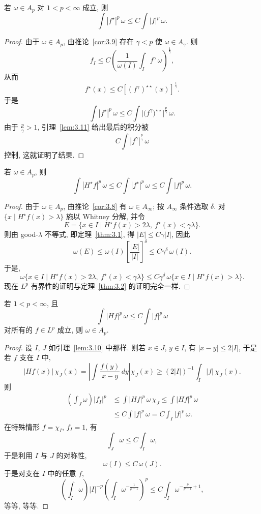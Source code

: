 \begin{theorem}\label{thm:3.12}
若 $\omega\in A_p$ 对 $1<p<\infty$ 成立, 则
\[
\int|f^{\star}|^{p}\,\omega\leq C\int|f|^{p}\,\omega.
\]
\end{theorem}

\begin{proof}
由于 $\omega\in A_p$, 由推论~\ref{cor:3.9} 存在 $\gamma<p$ 使 $\omega\in A_\gamma$. 则
\[
f_{I}\leq C\left(\frac{1}{\omega(I)}\int_{I}f^{\gamma}\,\omega\right)^{\frac{1}{\gamma}},
\]
从而
\[
f^{\star}(x)\leq C\left[\left(f^{\gamma}\right)^{\star\star}(x)\right]^{\frac{1}{\gamma}}.
\]
于是
\[
\int|f^{\star}|^{p}\,\omega\leq C\int\bigl|\bigl(f^{\gamma}\bigr)^{\star\star}\bigr|^{\frac{p}{\gamma}}\,\omega.
\]
由于 $\frac{p}{\gamma}>1$, 引理~\ref{lem:3.11} 给出最后的积分被
\[
C\int|f^{\gamma}|^{\frac{p}{\gamma}}\,\omega
\]
控制, 这就证明了结果.
\end{proof}

\begin{theorem}\label{thm:3.13}
若 $\omega\in A_p$, 则
\[
\int|H^{\star}f|^{p}\,\omega\leq C\int|f^{\star}|^{p}\,\omega\leq C\int|f|^{p}\,\omega.
\]
\end{theorem}

\begin{proof}
由于 $\omega\in A_p$, 由推论~\ref{cor:3.8} 有 $\omega\in A_\infty$; 按 $A_\infty$ 条件选取 $\delta$. 对 $\{x \mid H^{\star}f(x)>\lambda\}$ 施以 Whitney 分解, 并令
\[
E=\{x\in I \mid H^{\star}f(x)>2\lambda,\ f^{\star}(x)<\gamma\lambda\}.
\]
则由 good-$\lambda$ 不等式, 即定理~\ref{thm:3.1}, 得 $|E|\leq C\gamma|I|$, 因此
\[
\omega(E)\leq\omega(I)\left[\frac{|E|}{|I|}\right]^{\delta}\leq C\gamma^{\delta}\,\omega(I).
\]
于是,
\[
\omega\{x\in I \mid H^{\star}f(x)>2\lambda,\ f^{\star}(x)<\gamma\lambda\}
\leq C\gamma^{\delta}\,\omega\{x\in I \mid H^{\star}f(x)>\lambda\}.
\]
现在 $L^{p}$ 有界性的证明与定理~\ref{thm:3.2} 的证明完全一样.
\end{proof}

\begin{proposition}\label{prop:3.14}
若 $1<p<\infty$, 且
\[
\int|H f|^{p}\,\omega\leq C\int|f|^{p}\,\omega
\]
对所有的 $f\in L^{p}$ 成立, 则 $\omega\in A_{p}$.
\end{proposition}

\begin{proof}
设 $I$, $J$ 如引理~\ref{lem:3.10} 中那样. 则若 $x\in J$, $y\in I$, 有 $|x-y|\leq 2|I|$, 于是若 $f$ 支在 $I$ 中,
\[
|H f(x)|\,\chi_{J}(x)=\left|\int\frac{f(y)}{x-y}\,dy\right|\chi_{J}(x)\geq(2|I|)^{-1}\int_{I}|f|\,\chi_{J}(x).
\]
则
\begin{align*}
\left(\int_{J}\omega\right)|f_{I}|^{p}
&\leq\int|H f|^{p}\,\omega\,\chi_{J}\leq\int|H f|^{p}\,\omega \\
&\leq C\int|f|^{p}\,\omega=C\int_{I}|f|^{p}\,\omega.
\end{align*}
在特殊情形 $f=\chi_{I}$, $f_{I}=1$, 有
\[
\int_{J}\omega\leq C\int_{I}\omega,
\]
于是利用 $I$ 与 $J$ 的对称性,
\[
\omega(I)\leq C\,\omega(J).
\]
于是对支在 $I$ 中的任意 $f$,
\[
\left(\int_{I}\omega\right)|I|^{-p}\left(\int_{I}\omega^{-\frac{1}{p-1}}\right)^{p}
\leq C\int_{I}\omega^{-\frac{p}{p-1}+1},
\]
等等, 等等.
\end{proof}

